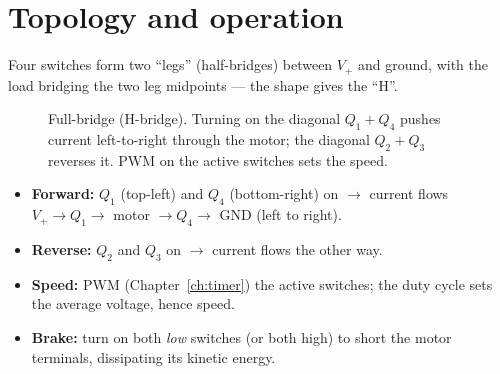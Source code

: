 \documentclass[11pt,a4paper,oneside]{book}
\begin{document}
\section{Topology and operation}
Four switches form two ``legs'' (half-bridges) between $V_+$ and ground, with the
load bridging the two leg midpoints --- the shape gives the ``H''.

\begin{figure}[h]
\centering
{}
\caption{Full-bridge (H-bridge). Turning on the diagonal $Q_1{+}Q_4$ pushes
current left-to-right through the motor; the diagonal $Q_2{+}Q_3$ reverses it.
PWM on the active switches sets the speed.}
\label{fig:hbridge}
\end{figure}

\begin{itemize}[leftmargin=1.4cm]
  \item \textbf{Forward:} $Q_1$ (top-left) and $Q_4$ (bottom-right) on $\to$
        current flows $V_+\to Q_1\to$ motor $\to Q_4\to$ GND (left to right).
  \item \textbf{Reverse:} $Q_2$ and $Q_3$ on $\to$ current flows the other way.
  \item \textbf{Speed:} PWM (Chapter~\ref{ch:timer}) the active switches; the duty
        cycle sets the average voltage, hence speed.
  \item \textbf{Brake:} turn on both \emph{low} switches (or both high) to short
        the motor terminals, dissipating its kinetic energy.
\end{itemize}
\end{document}
